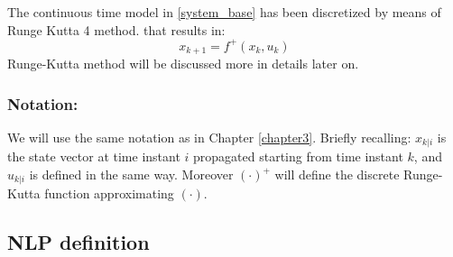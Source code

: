 The continuous time model in \ref{system_base} has been discretized by means of Runge Kutta 4 method. that results in:
\begin{equation} \label{system_base_d}
	{x}_{k+1}=f^+(x_k,u_k)
\end{equation}
Runge-Kutta method will be discussed more in details later on.

\subsubsection*{Notation:}
We will use the same notation as in Chapter \ref{chapter3}. Briefly recalling: ${x}_{k|i}$ is the state vector at time instant $i$ propagated starting from time instant $k$, and ${u}_{k|i}$ is defined in the same way. Moreover $(\cdot)^+$ will define the discrete Runge-Kutta function approximating $(\cdot)$.

\subsection{NLP definition}

